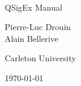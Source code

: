 \documentclass[letterpaper,11pt]{report}
\begin{document}
\thispagestyle{empty}
\begin{center}
\ 

\Large
{\Huge QSigEx Manual}

Pierre-Luc Drouin\\
Alain Bellerive

Carleton University

\today
\end{center}
\pagebreak

\renewcommand{\thepage}{\roman{page}}



\tableofcontents

\newpage
\renewcommand{\thepage}{\arabic{page}}
\setcounter{page}{1}


 


\nocite{Cowan:1998}
\begin{minipage}{0.9\linewidth}


\end{minipage}
\end{document}
